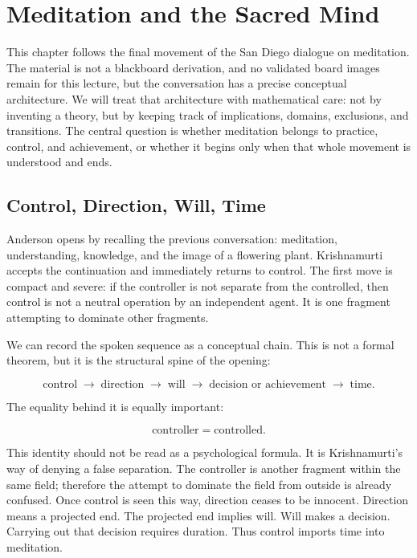 \chapter{Meditation and the Sacred Mind}

This chapter follows the final movement of the San Diego dialogue on meditation. The material is not a blackboard derivation, and no validated board images remain for this lecture, but the conversation has a precise conceptual architecture. We will treat that architecture with mathematical care: not by inventing a theory, but by keeping track of implications, domains, exclusions, and transitions. The central question is whether meditation belongs to practice, control, and achievement, or whether it begins only when that whole movement is understood and ends.

\section{Control, Direction, Will, Time}

Anderson opens by recalling the previous conversation: meditation, understanding, knowledge, and the image of a flowering plant. Krishnamurti accepts the continuation and immediately returns to control. The first move is compact and severe: if the controller is not separate from the controlled, then control is not a neutral operation by an independent agent. It is one fragment attempting to dominate other fragments.

We can record the spoken sequence as a conceptual chain. This is not a formal theorem, but it is the structural spine of the opening:

\begin{equation}
\text{control}
\;\longrightarrow\;
\text{direction}
\;\longrightarrow\;
\text{will}
\;\longrightarrow\;
\text{decision or achievement}
\;\longrightarrow\;
\text{time}.
\end{equation}

The equality behind it is equally important:

\begin{equation}
\text{controller} = \text{controlled}.
\end{equation}

This identity should not be read as a psychological formula. It is Krishnamurti's way of denying a false separation. The controller is another fragment within the same field; therefore the attempt to dominate the field from outside is already confused. Once control is seen this way, direction ceases to be innocent. Direction means a projected end. The projected end implies will. Will makes a decision. Carrying out that decision requires duration. Thus control imports time into meditation.


